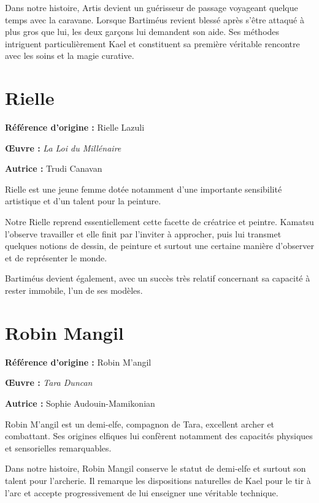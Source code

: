 Dans notre histoire, Artis devient un guérisseur de passage voyageant quelque
temps avec la caravane. Lorsque Bartiméus revient blessé après s'être attaqué
à plus gros que lui, les deux garçons lui demandent son aide. Ses méthodes
intriguent particulièrement Kael et constituent sa première véritable
rencontre avec les soins et la magie curative.

\section*{Rielle}

\textbf{Référence d'origine :} Rielle Lazuli

\textbf{Œuvre :} \textit{La Loi du Millénaire}

\textbf{Autrice :} Trudi Canavan

Rielle est une jeune femme dotée notamment d'une importante sensibilité
artistique et d'un talent pour la peinture.

Notre Rielle reprend essentiellement cette facette de créatrice et peintre.
Kamatsu l'observe travailler et elle finit par l'inviter à approcher, puis lui
transmet quelques notions de dessin, de peinture et surtout une certaine
manière d'observer et de représenter le monde.

Bartiméus devient également, avec un succès très relatif concernant sa
capacité à rester immobile, l'un de ses modèles.

\section*{Robin Mangil}

\textbf{Référence d'origine :} Robin M'angil

\textbf{Œuvre :} \textit{Tara Duncan}

\textbf{Autrice :} Sophie Audouin-Mamikonian

Robin M'angil est un demi-elfe, compagnon de Tara, excellent archer et
combattant. Ses origines elfiques lui confèrent notamment des capacités
physiques et sensorielles remarquables.

Dans notre histoire, Robin Mangil conserve le statut de demi-elfe et surtout
son talent pour l'archerie. Il remarque les dispositions naturelles de Kael
pour le tir à l'arc et accepte progressivement de lui enseigner une véritable
technique.

